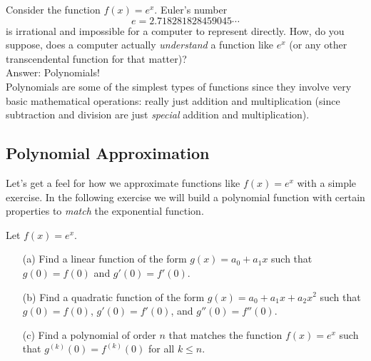 Consider the function $f(x) = e^x$.  Euler's number
\[ e = 2.718281828459045\cdots \]
is irrational and
impossible for a computer to represent directly.  How, do you suppose, does
a computer actually {\it understand} a function like $e^x$ (or any other
transcendental function for that matter)? \\
Answer: Polynomials! \\
Polynomials are some of the simplest types of functions since they involve very basic
mathematical operations: really just addition and multiplication (since subtraction
and division are just {\it special} addition and multiplication).  

\subsection{Polynomial Approximation}
Let's get a feel for how we approximate functions like $f(x) = e^x$ with a simple
exercise. In the following exercise we will build a polynomial function with certain
properties to {\it match} the exponential function.
\begin{problem}\label{prob:taylor_intro}
    Let $f(x) = e^x$.
    \begin{enumerate}
        \item[(a)] Find a linear function of the form $g(x) = a_0 + a_1 x$ such that $g(0)
            = f(0)$ and $g'(0) = f'(0)$. 
        \item[(b)] Find a quadratic function of the form $g(x) = a_0 + a_1 x + a_2 x^2$
            such that $g(0) = f(0)$, $g'(0) = f'(0)$, and $g''(0) = f''(0)$. 
        \item[(c)] Find a polynomial of order $n$ that matches the function $f(x) = e^x$
            such that $g^{(k)}(0) = f^{(k)}(0)$ for all $k \le n$. \solution{
                \[ g(x) = 1 + x + \frac{x^2}{2} + \frac{x^3}{3!} + \frac{x^4}{4!} + \cdots
                    + \frac{x^n}{n!}. \]
            }
    \end{enumerate}
\end{problem}


